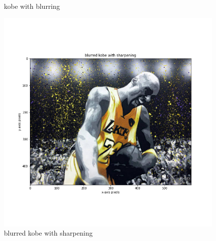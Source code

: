 \documentclass{article}
\begin{document}
\begin{figure}[!htb]
    \caption{kobe with blurring}\label{fig:awesome_image2}
\endminipage
{}
    \includegraphics[width=\linewidth]{blurred kobe with sharpening.png}
    \caption{blurred kobe with sharpening}\label{fig:awesome_image2}
\endminipage
\end{figure}
\FloatBarrier
\end{document}
